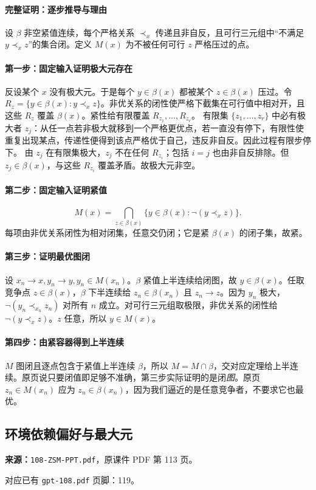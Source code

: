 \paragraph{完整证明：逐步推导与理由}

设 $\beta$ 非空紧值连续，每个严格关系 $\prec_x$ 传递且非自反，且可行三元组中“不满足 $y\prec_x z$”的集合闭。定义 $M(x)$ 为不被任何可行 $z$ 严格压过的点。
\paragraph{第一步：固定输入证明极大元存在}
反设某个 $x$ 没有极大元。于是每个 $y\in\beta(x)$ 都被某个 $z\in\beta(x)$ 压过。令 $R_z=\{y\in\beta(x):y\prec_x z\}$。非优关系的闭性使严格下截集在可行值中相对开，且这些 $R_z$ 覆盖 $\beta(x)$。紧性给有限覆盖 $R_{z_1},\ldots,R_{z_r}$。
有限集 $\{z_1,\ldots,z_r\}$ 中必有极大者 $z_j$：从任一点若非极大就移到一个严格更优点，若一直没有停下，有限性使重复出现某点，传递性便得到该点严格优于自己，违反非自反。因此过程有限步停下。
由 $z_j$ 在有限集极大，$z_j$ 不在任何 $R_{z_i}$；包括 $i=j$ 也由非自反排除。但 $z_j\in\beta(x)$，与这些 $R_{z_i}$ 覆盖矛盾。故极大元非空。
\paragraph{第二步：固定输入证明紧值}
\[M(x)=\bigcap_{z\in\beta(x)}\{y\in\beta(x):\neg(y\prec_x z)\}.\]
每项由非优关系闭性为相对闭集，任意交仍闭；它是紧 $\beta(x)$ 的闭子集，故紧。
\paragraph{第三步：证明最优图闭}
设 $x_n\to x,y_n\to y,y_n\in M(x_n)$。$\beta$ 紧值上半连续给闭图，故 $y\in\beta(x)$。任取竞争点 $z\in\beta(x)$，$\beta$ 下半连续给 $z_n\in\beta(x_n)$ 且 $z_n\to z$。因为 $y_n$ 极大，$\neg(y_n\prec_{x_n}z_n)$ 对所有 $n$ 成立。对可行三元组取极限，非优关系的闭性给 $\neg(y\prec_x z)$。$z$ 任意，所以 $y\in M(x)$。
\paragraph{第四步：由紧容器得到上半连续}
$M$ 图闭且逐点包含于紧值上半连续 $\beta$，所以 $M=M\cap\beta$，交对应定理给上半连续。原页说只要闭值即足够不准确，第三步实际证明的是闭\emph{图}。原页 $z_n\in M(x_n)$ 应为 $z_n\in\beta(x_n)$，因为我们逼近的是任意竞争者，不要求它也最优。

\clearpage\subsection{环境依赖偏好与最大元}
\textbf{来源：}\texttt{108-ZSM-PPT.pdf}，原课件 PDF 第 113 页。\par
对应已有 \texttt{gpt-108.pdf} 页脚：119。\par
